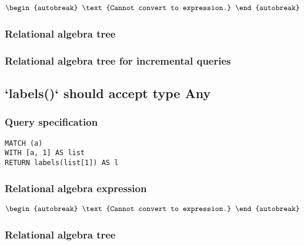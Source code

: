 \begin{align*}
\begin{autobreak}
\text{Cannot convert to expression.}
\end{autobreak}
\end{align*}

\subsubsection*{Relational algebra tree}


\subsubsection*{Relational algebra tree for incremental queries}


\subsection{`labels()` should accept type Any}

\subsubsection*{Query specification}

\begin{lstlisting}
MATCH (a)
WITH [a, 1] AS list
RETURN labels(list[1]) AS l
\end{lstlisting}

\subsubsection*{Relational algebra expression}

\begin{align*}
\begin{autobreak}
\text{Cannot convert to expression.}
\end{autobreak}
\end{align*}

\subsubsection*{Relational algebra tree}


